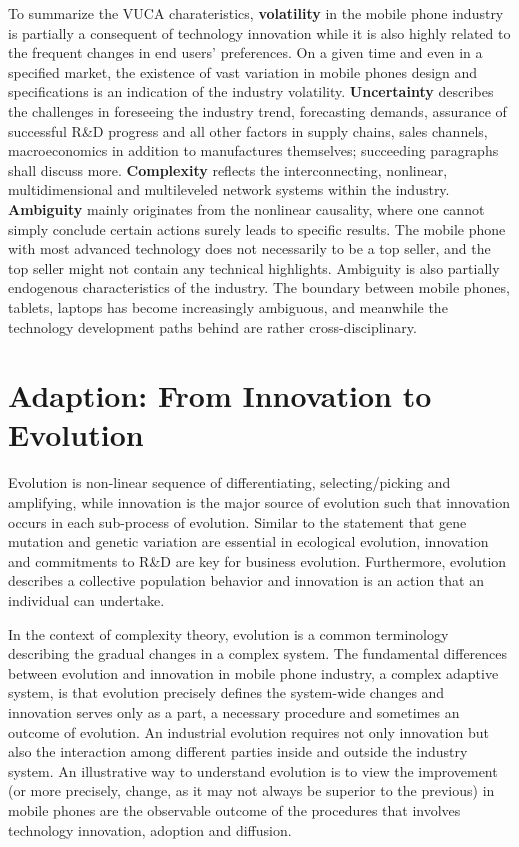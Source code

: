 \documentclass[utf8,english]{gradu3}
\begin{document}
To summarize the VUCA charateristics, \textbf{volatility} in the mobile phone industry is partially a consequent of technology innovation while it is also highly related to the frequent changes in end users’ preferences. On a given time and even in a specified market, the existence of vast variation in mobile phones design and specifications is an indication of the industry volatility. \textbf{Uncertainty} describes the challenges in foreseeing the industry trend, forecasting demands, assurance of successful R\&D progress and all other factors in supply chains, sales channels, macroeconomics in addition to manufactures themselves; succeeding paragraphs shall discuss more. \textbf{Complexity} reflects the interconnecting, nonlinear, multidimensional and multileveled network systems within the industry. \textbf{Ambiguity} mainly originates from the nonlinear causality, where one cannot simply conclude certain actions surely leads to specific results. The mobile phone with most advanced technology does not necessarily to be a top seller, and the top seller might not contain any technical highlights. Ambiguity is also partially endogenous characteristics of the industry. The boundary between mobile phones, tablets, laptops has become increasingly ambiguous, and meanwhile the technology development paths behind are rather cross-disciplinary.

\section{Adaption: From Innovation to Evolution }

Evolution is non-linear sequence of differentiating, selecting/picking and amplifying, while innovation is the major source of evolution such that innovation occurs in each sub-process of evolution. Similar to the statement that gene mutation and genetic variation are essential in ecological evolution, innovation and commitments to R\&D are key for business evolution. Furthermore, evolution describes a collective population behavior and innovation is an action that an individual can undertake.

In the context of complexity theory, evolution is a common terminology describing the gradual changes in a complex system. The fundamental differences between evolution and innovation in mobile phone industry, a complex adaptive system, is that evolution precisely defines the system-wide changes and innovation serves only as a part, a necessary procedure and sometimes an outcome of evolution. An industrial evolution requires not only innovation but also the interaction among different parties inside and outside the industry system. An illustrative way to understand evolution is to view the improvement (or more precisely, change, as it may not always be superior to the previous) in mobile phones are the observable outcome of the procedures that involves technology innovation, adoption and diffusion.
\end{document}

